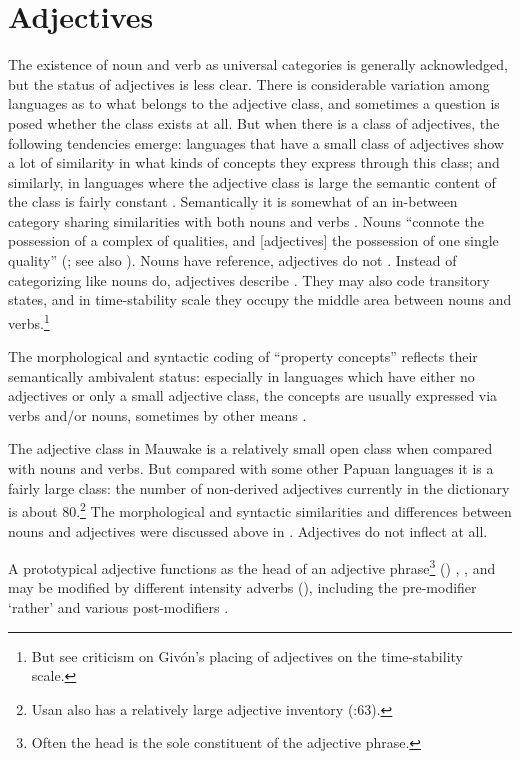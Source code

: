\section{Adjectives}\label{sec:3.3}
{}
The existence of noun and verb as universal categories is generally acknowledged, but the status of adjectives is less clear. There is considerable variation among languages as to what belongs to the adjective class, and sometimes a question is posed whether the class exists at all. But when there is a class of adjectives, the following tendencies emerge: languages that have a small class of adjectives show a lot of similarity in what kinds of concepts they express through this class; and similarly, in languages where the adjective class is large the semantic content of the class is fairly constant \citep[20]{Dixon1977}. Semantically it is somewhat of an in-between category sharing similarities with both nouns and verbs \citep[447]{Lyons1977}. Nouns ``connote the possession of a complex of qualities, and [adjectives] the possession of one single quality'' (\citealt[81]{Jespersen1924}; see also \citealt[362]{Wierzbicka1986}). Nouns have reference, adjectives do not \citep[77]{HakulinenEtAl1979}%
. Instead of categorizing like nouns do, adjectives describe \citep[357]{Wierzbicka1986}. They may also code transitory states, and in  time-stability scale they occupy the middle area between nouns and verbs.\footnote{But see  criticism on Giv\'on's placing of adjectives on the time-stability scale.} 

The morphological and syntactic coding of ``property concepts'' reflects their semantically ambivalent status: especially in languages which have either no adjectives or only a small adjective class, the concepts are usually expressed via verbs and/or nouns, sometimes by other means \citep[20]{Dixon1977}.

The adjective class in Mauwake is a relatively small open class when compared with nouns and verbs. But compared with some other Papuan languages \citep[50--51]{Dixon1977} it is a fairly large class: the number of non-derived adjectives currently in the dictionary is about 80.\footnote{Usan also has a relatively large adjective inventory (:63).} The morphological and syntactic similarities and differences between nouns and adjectives were discussed above in . Adjectives do not inflect at all. 

A prototypical adjective functions as the head of an adjective phrase\footnote{Often the head is the sole constituent of the adjective phrase.} () , , and may be modified by different intensity adverbs (), including the pre-modifier  `rather'  and various post-modifiers . 

